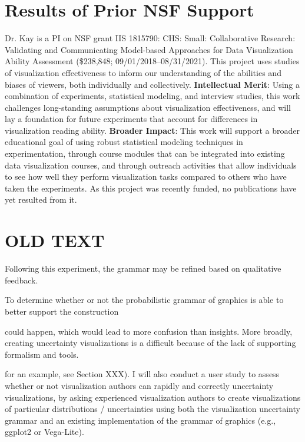 \documentclass[11pt]{article}
\begin{document}
\section{Results of Prior NSF Support}
\noindent Dr. Kay is a PI on NSF grant IIS 1815790: CHS: Small: Collaborative Research: Validating and Communicating Model-based 
Approaches for Data Visualization Ability Assessment (\$238,848; 09/01/2018--08/31/2021).  This project uses studies of visualization effectiveness to inform our understanding of the abilities and biases of viewers, both individually and collectively. \textbf{Intellectual Merit}: Using a combination of experiments, statistical modeling, and interview studies, this work challenges long-standing assumptions about visualization effectiveness, and will lay a foundation for future experiments that account for differences in visualization reading ability. \textbf{Broader Impact}: This work will support a broader educational goal of using robust statistical modeling techniques in experimentation, through course modules that can be integrated into existing data visualization courses, and through outreach activities that allow individuals to see how well they perform visualization tasks compared to others who have taken the experiments. As this project was recently funded, no publications have yet resulted from it.


\pagebreak
\pagebreak


\section{OLD TEXT}





Following this experiment, the grammar may be refined based on qualitative feedback.




To determine whether or not the probabilistic grammar of graphics is able to better support the construction


could happen, which would lead to more confusion than insights. More broadly, creating uncertainty visualizations is a difficult because of the lack of supporting formalism and tools. 

for an example, see Section XXX). I will also conduct a user study to assess whether or not visualization authors can rapidly and correctly uncertainty visualizations, by asking experienced visualization authors to create visualizations of particular distributions / uncertainties using both the visualization uncertainty grammar and an existing implementation of the grammar of graphics (e.g., ggplot2 or Vega-Lite).
\end{document}
